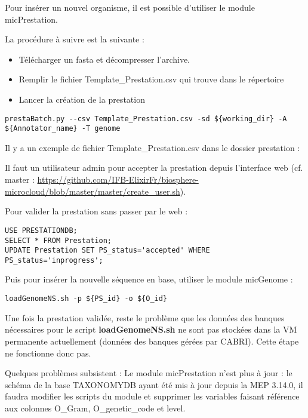 Pour insérer un nouvel organisme, il est possible d’utiliser le module micPrestation.

La procédure à suivre est la suivante :
\begin{itemize}
    \item Télécharger un fasta et décompresser l'archive.
    \item Remplir le fichier Template\_Prestation.csv qui trouve dans le répertoire 
    \item Lancer la création de la prestation
\end{itemize}

\begin{lstlisting}[style=bash]
prestaBatch.py --csv Template_Prestation.csv -sd ${working_dir} -A ${Annotator_name} -T genome
\end{lstlisting}
Il y a un exemple de fichier Template\_Prestation.csv dans le dossier prestation : 
\newline
\begin{mycolorbox}
	Il faut un utilisateur admin pour accepter la prestation depuis l'interface web (cf. master : \url{https://github.com/IFB-ElixirFr/biosphere-microcloud/blob/master/master/create_user.sh}).
\end{mycolorbox}
\bigskip

Pour valider la prestation sans passer par le web :
\begin{lstlisting}[style=SQL]
USE PRESTATIONDB;
SELECT * FROM Prestation;
UPDATE Prestation SET PS_status='accepted' WHERE PS_status='inprogress';
\end{lstlisting}
\bigskip
Puis pour insérer la nouvelle séquence en base, utiliser le module micGenome :
\begin{lstlisting}[style=bash]
loadGenomeNS.sh -p ${PS_id} -o ${O_id}
\end{lstlisting}

\begin{mycolorbox}
	Une fois la prestation validée, reste le problème que les données des banques nécessaires pour le script \textbf{loadGenomeNS.sh} ne sont pas stockées dans la VM permanente actuellement (données des banques gérées par CABRI).
	Cette étape ne fonctionne donc pas.
\end{mycolorbox}

Quelques problèmes subsistent :
Le module micPrestation n'est plus à jour : le schéma de la base TAXONOMYDB ayant été mis à jour depuis la MEP 3.14.0, il faudra modifier les scripts du module et supprimer les variables faisant référence aux colonnes O\_Gram, O\_genetic\_code et level.
\newline

